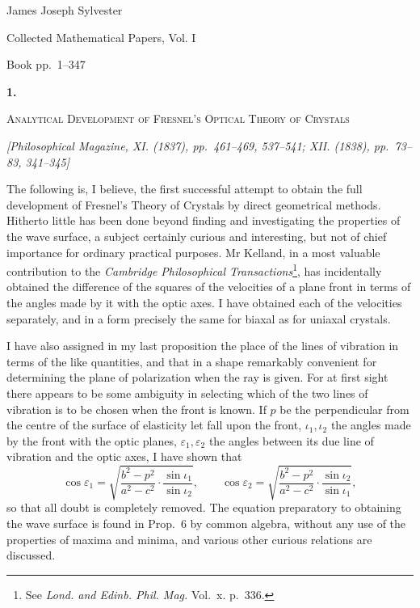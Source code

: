 \documentclass[11pt]{article}
\newcommand{\paperhead}[3]{%
  \clearpage
  \begin{center}
  {\Large\bfseries #1.}\par\vspace{0.85em}
  {\large\scshape #2}\par\vspace{0.6em}
  {\itshape [#3]}\par
  \end{center}\vspace{0.4em}}
\newcommand{\sourcepage}[1]{\marginpar{\scriptsize p.~#1}}
\begin{document}
\begin{center}
{\Large James Joseph Sylvester}\par\vspace{0.25em}
{\large Collected Mathematical Papers, Vol. I}\par\vspace{0.25em}
{\normalsize Book pp.~1--347}\par
\end{center}
\thispagestyle{empty}
\vspace{0.75em}

\paperhead{1}{Analytical Development of Fresnel's Optical Theory of Crystals}{Philosophical Magazine, XI. (1837), pp.~461--469, 537--541; XII. (1838), pp.~73--83, 341--345}

\sourcepage{1}
The following is, I believe, the first successful attempt to obtain the full development of Fresnel's Theory of Crystals by direct geometrical methods. Hitherto little has been done beyond finding and investigating the properties of the wave surface, a subject certainly curious and interesting, but not of chief importance for ordinary practical purposes. Mr Kelland, in a most valuable contribution to the \emph{Cambridge Philosophical Transactions}\footnote{See \emph{Lond. and Edinb. Phil. Mag.} Vol.~x. p.~336.}, has incidentally obtained the difference of the squares of the velocities of a plane front in terms of the angles made by it with the optic axes. I have obtained each of the velocities separately, and in a form precisely the same for biaxal as for uniaxal crystals.

I have also assigned in my last proposition the place of the lines of vibration in terms of the like quantities, and that in a shape remarkably convenient for determining the plane of polarization when the ray is given. For at first sight there appears to be some ambiguity in selecting which of the two lines of vibration is to be chosen when the front is known. If $p$ be the perpendicular from the centre of the surface of elasticity let fall upon the front, $\iota_1,\iota_2$ the angles made by the front with the optic planes, $\varepsilon_1,\varepsilon_2$ the angles between its due line of vibration and the optic axes, I have shown that
\[
\cos \varepsilon_1=
\sqrt{\frac{b^2-p^2}{a^2-c^2}\cdot\frac{\sin\iota_1}{\sin\iota_2}},
\qquad
\cos \varepsilon_2=
\sqrt{\frac{b^2-p^2}{a^2-c^2}\cdot\frac{\sin\iota_2}{\sin\iota_1}},
\]
so that all doubt is completely removed. The equation preparatory to obtaining the wave surface is found in Prop.~6 by common algebra, without any use of the properties of maxima and minima, and various other curious relations are discussed.
\end{document}

